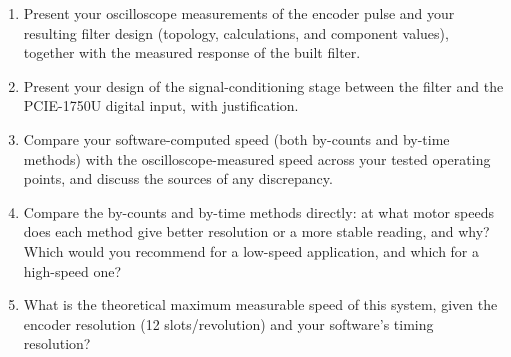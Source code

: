 \begin{procedure}
  \vspace*{2.5em}
  \begin{boxedtable}
  \end{boxedtable}
\end{procedure}\newpage

\begin{reportq}
  \begin{enumerate}
    \item Present your oscilloscope measurements of the encoder pulse and your resulting filter design (topology, calculations, and component values), together with the measured response of the built filter.
    \item Present your design of the signal-conditioning stage between the filter and the PCIE-1750U digital input, with justification.
    \item Compare your software-computed speed (both by-counts and by-time methods) with the oscilloscope-measured speed across your tested operating points, and discuss the sources of any discrepancy.
    \item Compare the by-counts and by-time methods directly: at what motor speeds does each method give better resolution or a more stable reading, and why? Which would you recommend for a low-speed application, and which for a high-speed one?
    \item What is the theoretical maximum measurable speed of this system, given the encoder resolution (12 slots/revolution) and your software's timing resolution?
  \end{enumerate}
\end{reportq}

